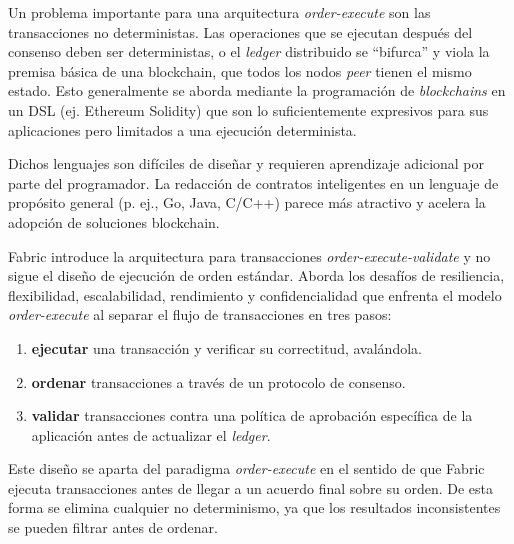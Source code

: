 
Un problema importante para una arquitectura \textit{order-execute} son las transacciones no deterministas. Las operaciones que se ejecutan después del consenso deben ser deterministas, o el \textit{ledger} distribuido se “bifurca” y viola la premisa básica de una blockchain, que todos los nodos \textit{peer} tienen el mismo estado. Esto generalmente se aborda mediante la programación de \textit{blockchains} en un DSL (ej. Ethereum Solidity) que son lo suficientemente expresivos para sus aplicaciones pero limitados a una ejecución determinista.

Dichos lenguajes son difíciles de diseñar y requieren
aprendizaje adicional por parte del programador. La redacción de contratos inteligentes en un lenguaje de propósito general (p. ej., Go, Java, C/C++) parece más atractivo y acelera la adopción de soluciones blockchain.


Fabric introduce la arquitectura para transacciones \textit{order-execute-validate} y no sigue el diseño de ejecución de orden estándar. Aborda los desafíos de resiliencia, flexibilidad, escalabilidad, rendimiento y confidencialidad que enfrenta el modelo \textit{order-execute} al separar el flujo de transacciones en tres pasos:
\begin{enumerate}
 \item \textbf{ejecutar} una transacción y verificar su correctitud, avalándola.
 \item \textbf{ordenar} transacciones a través de un protocolo de consenso.
   \item \textbf{validar} transacciones contra una política de aprobación específica de la aplicación antes de actualizar el \textit{ledger}.
\end{enumerate}

Este diseño se aparta del paradigma \textit{order-execute} en el sentido de que Fabric ejecuta transacciones antes de llegar a un acuerdo final sobre su orden. De esta forma se elimina cualquier no determinismo, ya que los resultados inconsistentes se pueden filtrar antes de ordenar.

